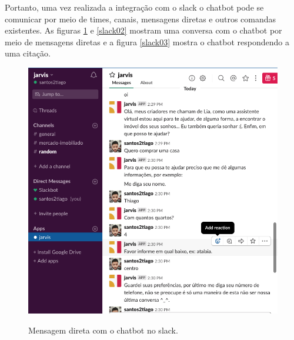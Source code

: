 Portanto, uma vez realizada a integração com o slack o chatbot pode se comunicar por meio de times, canais, mensagens diretas e outros comandas existentes.  As figuras \ref{slack01} e \ref{slack02} mostram uma conversa com o chatbot por meio de mensagens diretas e a figura \ref{slack03} mostra o chatbot respondendo a uma citação.


\begin{figure}[H]
  \centering
   \caption{Mensagem direta com o chatbot no slack.}
  \includegraphics[scale=0.5]{Imagens/slack01.png} 
  \label{slack01}
\end{figure}


